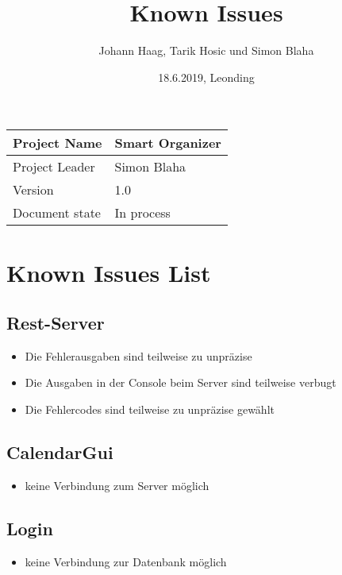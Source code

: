 \documentclass[12pt]{scrartcl}
\title{Known Issues}
\author{Johann Haag, Tarik Hosic und Simon Blaha}
\date{18.6.2019, Leonding}
\begin{document}
    \maketitle
    \begin{flushleft}
    \begin{tabular}{|l|l|}
    \hline
    Project Name & Smart Organizer \\ \hline
    Project Leader & Simon Blaha \\ \hline
    Version & 1.0\\ \hline
    Document state & In process \\ \hline
    \end{tabular}
    \end{flushleft}

    \pagebreak
    \tableofcontents
    \pagebreak

    \section{Known Issues List}
    \subsection{Rest-Server}
    \begin{itemize}
        \item Die Fehlerausgaben sind teilweise zu unpräzise 
        \item Die Ausgaben in der Console beim Server sind teilweise verbugt 
        \item Die Fehlercodes sind teilweise zu unpräzise gewählt
    \end{itemize}

    \subsection{CalendarGui}
    \begin{itemize}
        \item keine Verbindung zum Server möglich
    \end{itemize}

    \subsection{Login}
    \begin{itemize}
        \item keine Verbindung zur Datenbank möglich
    \end{itemize}
\end{document}
